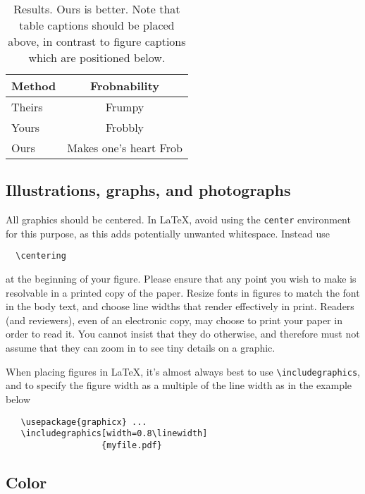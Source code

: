 \begin{table}
  \centering
  \caption[Results]{Results. Ours is better. Note that table captions should be placed above, in contrast to figure captions which are positioned below.}
  \begin{tabular}{@{}lc@{}}
    \toprule
    Method & Frobnability \\
    \midrule
    Theirs & Frumpy \\
    Yours & Frobbly \\
    Ours & Makes one's heart Frob\\
    \bottomrule
  \end{tabular}
  \label{tab:example}
\end{table}

\subsection{Illustrations, graphs, and photographs}

All graphics should be centered.
In \LaTeX, avoid using the \texttt{center} environment for this purpose, as this adds potentially unwanted whitespace.
Instead use
{\small\begin{verbatim}
  \centering
\end{verbatim}}
at the beginning of your figure.
Please ensure that any point you wish to make is resolvable in a printed copy of the paper.
Resize fonts in figures to match the font in the body text, and choose line widths that render effectively in print.
Readers (and reviewers), even of an electronic copy, may choose to print your paper in order to read it.
You cannot insist that they do otherwise, and therefore must not assume that they can zoom in to see tiny details on a graphic.

When placing figures in \LaTeX, it's almost always best to use \verb+\includegraphics+, and to specify the figure width as a multiple of the line width as in the example below
{\small\begin{verbatim}
   \usepackage{graphicx} ...
   \includegraphics[width=0.8\linewidth]
                   {myfile.pdf}
\end{verbatim}
}

\subsection{Color}

